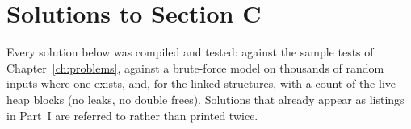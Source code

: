 \chapter{Solutions to Section C}\label{ch:solproblems}

Every solution below was compiled and tested: against the sample tests of
Chapter~\ref{ch:problems}, against a brute-force model on thousands of random inputs
where one exists, and, for the linked structures, with a count of the live heap blocks
(no leaks, no double frees). Solutions that already appear as listings in Part~I are
referred to rather than printed twice.






